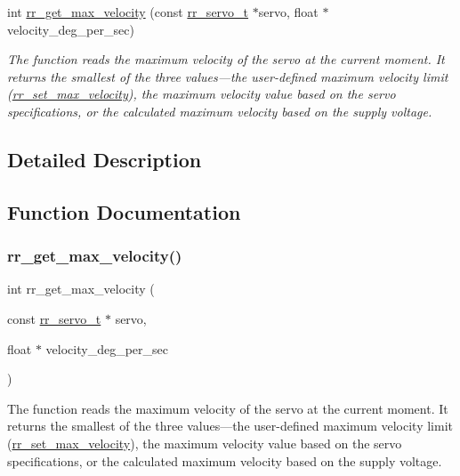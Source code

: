 \begin{DoxyCompactItemize}
int \hyperlink{group___servo__info_gad388cd353b262b614b563b093d61c911}{rr\+\_\+get\+\_\+max\+\_\+velocity} (const \hyperlink{structrr__servo__t}{rr\+\_\+servo\+\_\+t} $\ast$servo, float $\ast$velocity\+\_\+deg\+\_\+per\+\_\+sec)
\begin{DoxyCompactList}\small\item\em The function reads the maximum velocity of the servo at the current moment. It returns the smallest of the three values—the user-\/defined maximum velocity limit (\hyperlink{group___servo__config_ga18d5d9dc728f7cb8e7674b9e9b275aca}{rr\+\_\+set\+\_\+max\+\_\+velocity}), the maximum velocity value based on the servo specifications, or the calculated maximum velocity based on the supply voltage. \end{DoxyCompactList}\end{DoxyCompactItemize}


\subsection{Detailed Description}


\subsection{Function Documentation}
\mbox{\label{group___servo__info_gad388cd353b262b614b563b093d61c911}} 
\subsubsection{\texorpdfstring{rr\+\_\+get\+\_\+max\+\_\+velocity()}{rr\_get\_max\_velocity()}}
{\footnotesize\ttfamily int rr\+\_\+get\+\_\+max\+\_\+velocity (\begin{DoxyParamCaption}\item[{const \hyperlink{structrr__servo__t}{rr\+\_\+servo\+\_\+t} $\ast$}]{servo,  }\item[{float $\ast$}]{velocity\+\_\+deg\+\_\+per\+\_\+sec }\end{DoxyParamCaption})}



The function reads the maximum velocity of the servo at the current moment. It returns the smallest of the three values—the user-\/defined maximum velocity limit (\hyperlink{group___servo__config_ga18d5d9dc728f7cb8e7674b9e9b275aca}{rr\+\_\+set\+\_\+max\+\_\+velocity}), the maximum velocity value based on the servo specifications, or the calculated maximum velocity based on the supply voltage. 


